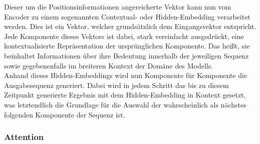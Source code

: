 Dieser um die Positionsinformationen angereicherte Vektor kann nun vom Encoder zu einem sogenannten Contextual- oder Hidden-Embedding verarbeitet werden. Dies ist ein Vektor, welcher grundsätzlich dem Eingangsvektor entspricht. Jede Komponente dieses Vektors ist dabei, stark vereinfacht ausgedrückt, eine kontextualisierte Repräsentation der ursprünglichen Komponente. Das heißt, sie beinhaltet Informationen über ihre Bedeutung innerhalb der jeweiligen Sequenz sowie gegebenenfalls im breiteren Kontext der Domäne des Modells. \\
Anhand dieses Hidden-Embeddings wird nun Komponente für Komponente die Ausgabesequenz generiert. Dabei wird in jedem Schritt das bis zu diesem Zeitpunkt generierte Ergebnis mit dem Hidden-Embedding in Kontext gesetzt, was letztendlich die Grundlage für die Auswahl der wahrscheinlich als nächstes folgenden Komponente der Sequenz ist.

\subsubsection{Attention}

